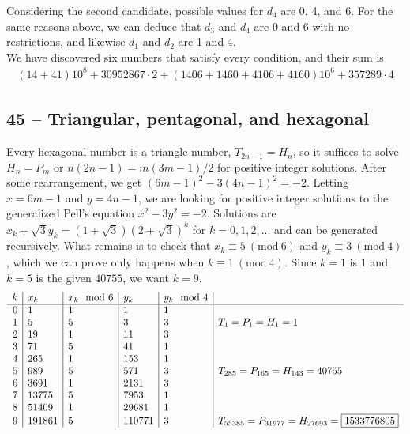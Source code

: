 \documentclass{article}
\newcommand{\Mod}[1]{\ (\mathrm{mod}\ #1)}
\begin{document}
Considering the second candidate, possible values for $d_4$ are 0, 4, and 6. For the same reasons above, we can deduce that $d_3$ and $d_4$ are 0 and 6 with no restrictions, and likewise $d_1$ and $d_2$ are 1 and 4. \\

We have discovered six numbers that satisfy every condition, and their sum is
\begin{align*}
	\boxed{ (14+41)10^8 + 30952867 \cdot 2 + (1406+1460+4106+4160)10^6 + 357289 \cdot 4 }
\end{align*}

\subsection*{45 -- Triangular, pentagonal, and hexagonal} 
Every hexagonal number is a triangle number, $T_{2n-1} = H_n$, so it suffices to solve $H_n = P_m$ or $n(2n-1) = m(3m-1)/2$ for positive integer solutions. 
After some rearrangement, we get $(6m-1)^2 - 3(4n-1)^2 = -2$. 
Letting $x = 6m-1$ and $y = 4n-1$, we are looking for positive integer solutions to the generalized Pell's equation $x^2 - 3y^2 = -2$.
Solutions are $x_k + \sqrt{3} y_k = (1+\sqrt{3})(2+\sqrt{3})^k$ for $k = 0, 1, 2, \dotsc$ and can be generated recursively.
What remains is to check that $x_k \equiv 5 \Mod{6}$ and $y_k \equiv 3 \Mod{4}$, which we can prove only happens when $k \equiv 1 \Mod{4}$. 
Since $k =1$ is $1$ and $k=5$ is the given $40755$, we want $k=9$.
\begin{align*}
	\begin{array}{r | l |l | l | l | l}
	k & x_k & x_k \mod 6 & y_k & y_k \mod 4 & \\ \hline
	0 & 1 & 1 & 1 & 1 \\
	1 & 5 & 5 & 3 & 3 & T_1 = P_1 = H_1 = 1\\
	2 & 19 & 1 & 11 & 3 \\
	3 & 71 & 5 & 41 & 1 \\
	4 & 265 & 1 & 153 & 1 \\
	5 & 989 & 5 & 571 & 3 & T_{285} = P_{165} = H_{143} = 40755 \\
	6 & 3691 & 1 & 2131 & 3 \\
	7 & 13775 & 5 & 7953 & 1 \\
	8 & 51409 & 1 & 29681 & 1 \\
	9 & 191861 & 5 & 110771 & 3 & T_{55385} = P_{31977} = H_{27693} = \boxed{1533776805}
	\end{array}
\end{align*}
\end{document}
